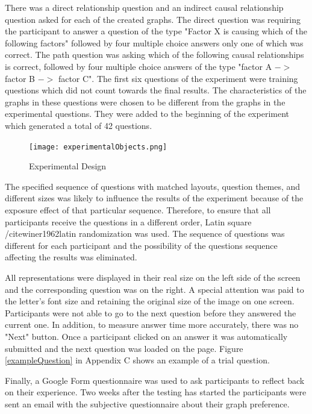 \documentclass{l4proj}
\begin{document}
There was a direct relationship question and an indirect causal relationship question asked for each of the created graphs. The direct question was requiring the participant to answer a question of the type "Factor X is causing which of the following factors" followed by four multiple choice answers only one of which was correct. The path question was asking which of the following causal relationships is correct, followed by four multiple choice answers of the type "factor A $->$ factor B $->$ factor C". The first six questions of the experiment were training questions which did not count towards the final results. The characteristics of the graphs in these questions were chosen to be different from the graphs in the experimental questions. They were added to the beginning of the experiment which generated a total of 42 questions.

\begin{figure}[H]
\centering
\texttt{[image: experimentalObjects.png]}
\caption{Experimental Design}
\label{experimentalDesign}
\end{figure}


The specified sequence of questions with matched layouts, question themes, and different sizes was likely to influence the results of the experiment because of the exposure effect of that particular sequence. Therefore, to ensure that all participants receive the questions in a different order, Latin square /cite{winer1962latin} randomization was used. The sequence of questions was different for each participant and the possibility of the questions sequence affecting the results was eliminated.
  
All representations were displayed in their real size on the left side of the screen and the corresponding question was on the right. A special attention was paid to the letter's font size and retaining the original size of the image on one screen. Participants were not able to go to the next question before they answered the current one. In addition, to measure answer time more accurately, there was no "Next" button. Once a participant clicked on an answer it was automatically submitted and the next question was loaded on the page. Figure \ref{exampleQuestion} in Appendix C shows an example of a trial question.

Finally, a Google Form questionnaire was used to ask participants to reflect back on their experience. Two weeks after the testing has started the participants were sent an email with the subjective questionnaire about their graph preference. 
\end{document}
